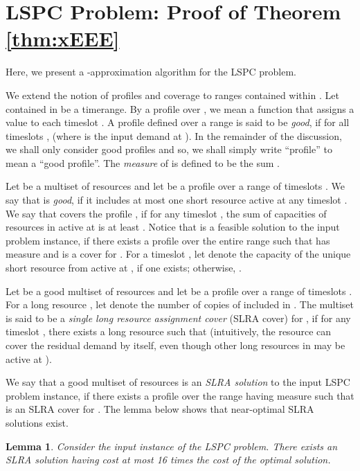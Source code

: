 \documentclass[11pt]{article}
\newtheorem{lemma}[theorem]{Lemma}
\newcommand{\lspc}{{\sc LSPC}}
\begin{document}
\section{{\lspc} Problem: Proof of Theorem \ref{thm:xEEE}}
\label{sec:lspc}
Here, we present a -approximation algorithm for the {\lspc} problem.

We extend the notion of profiles and coverage to ranges contained within . 
Let  contained in  be a timerange. 
By a profile over , we mean a function  that assigns a value  to each timeslot . 
A profile  defined over a range  is said to be {\em good}, if for all timeslots ,
 (where  is the input demand at ).
In the remainder of the discussion, we shall only consider good profiles and so, we shall simply write
``profile'' to mean a ``good profile''.
The {\em measure} of  is defined to be the sum  .

Let  be a multiset of resources and let  be a profile over a range of timeslots .
We say that  is {\em good}, if it includes at most one short resource active at any timeslot .
We say that  covers the profile , 
if for any timeslot , the sum of capacities of resources
in  active at  is at least . 
Notice that  is a feasible solution to the input problem instance,
if there exists a profile  over the entire range  such that 
 has measure  and  is a cover for .
For a timeslot , let 
denote the capacity of the unique short resource from  active at , if one exists; otherwise, 
.

Let  be a good multiset of resources and let  be a profile over a range of timeslots . 
For a long resource , let  denote the number of copies of  included in .
The multiset  is said to be a {\em single long resource assignment cover} (SLRA cover) for ,
if for any timeslot , there exists a long resource  such that
 (intuitively, the resource  can cover the residual demand by itself,
even though other long resources in  may be active at ).

We say that a good multiset of resources  is an {\em SLRA solution} to the input {\lspc} problem instance,
if there exists a profile  over the range  having measure  such that  is an SLRA cover for .
The lemma below shows that near-optimal SLRA solutions exist.

\begin{lemma}
\label{lem:SLRA}
Consider the input instance of the {\lspc} problem.
There exists an SLRA solution having cost at most 16 times the cost of the optimal solution.
\end{lemma}
\end{document}
